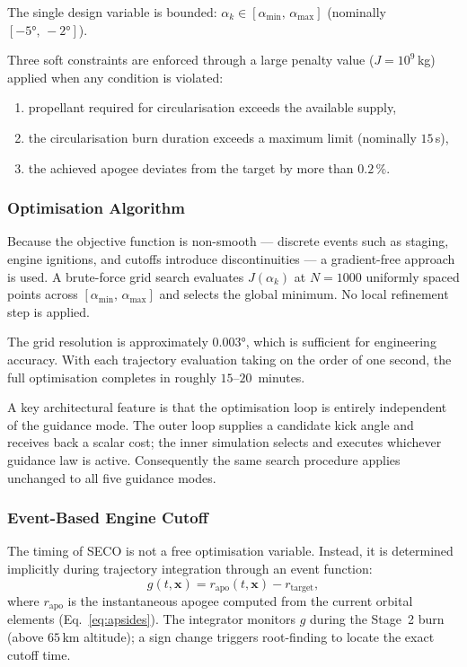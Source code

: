 The single design variable is bounded:
$\alpha_k \in [\alpha_{\min},\,\alpha_{\max}]$ (nominally $[-5°,\,-2°]$).

Three soft constraints are enforced through a large penalty value
($J = 10^9$\,kg) applied when any condition is violated:
\begin{enumerate}
  \item propellant required for circularisation exceeds the available supply,
  \item the circularisation burn duration exceeds a maximum limit
        (nominally $15$\,s),
  \item the achieved apogee deviates from the target by more than $0.2\,\%$.
\end{enumerate}

\subsubsection{Optimisation Algorithm}
\label{sssec:opt_algorithm}

Because the objective function is non-smooth --- discrete events such as
staging, engine ignitions, and cutoffs introduce discontinuities --- a
gradient-free approach is used.  A brute-force grid search evaluates
$J(\alpha_k)$ at $N = 1000$ uniformly spaced points across
$[\alpha_{\min},\,\alpha_{\max}]$ and selects the global minimum.  No local
refinement step is applied.

The grid resolution is approximately $0.003°$, which is sufficient for
engineering accuracy.  With each trajectory evaluation taking on the order of
one second, the full optimisation completes in roughly $15$--$20$~minutes.

A key architectural feature is that the optimisation loop is entirely
independent of the guidance mode.  The outer loop supplies a candidate kick
angle and receives back a scalar cost; the inner simulation selects and
executes whichever guidance law is active.  Consequently the same search
procedure applies unchanged to all five guidance modes.

\subsubsection{Event-Based Engine Cutoff}
\label{sssec:seco_event}

The timing of SECO is not a free optimisation variable.  Instead, it is
determined implicitly during trajectory integration through an event function:
\begin{equation}
  g(t,\mathbf{x}) = r_{\text{apo}}(t,\mathbf{x}) - r_{\text{target}},
  \label{eq:seco_event}
\end{equation}
where $r_{\text{apo}}$ is the instantaneous apogee computed from the current
orbital elements (Eq.~\ref{eq:apsides}).  The integrator monitors $g$ during
the Stage~2 burn (above $65$\,km altitude); a sign change triggers root-finding
to locate the exact cutoff time.

